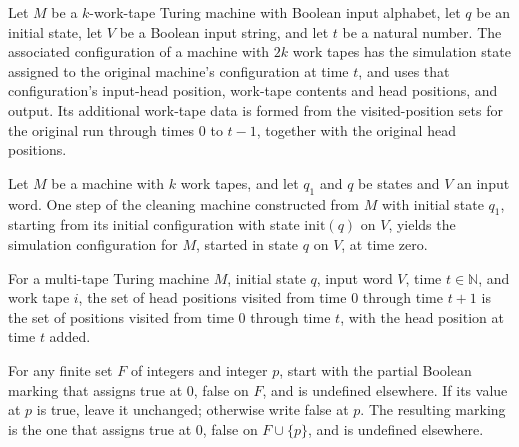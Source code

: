 \begin{definition}
\label{Complexity.LogProg.simCfg}
\leanok
{}
Let $M$ be a $k$-work-tape Turing machine with Boolean input alphabet, let $q$ be an
initial state, let $V$ be a Boolean input string, and let $t$ be a natural number. The
associated configuration of a machine with $2k$ work tapes has the simulation state
assigned to the original machine's configuration at time $t$, and uses that
configuration's input-head position, work-tape contents and head positions, and output.
Its additional work-tape data is formed from the visited-position sets for the original
run through times $0$ to $t-1$, together with the original head positions.
\end{definition}

\begin{lemma}
\label{Complexity.LogProg.init_step}
\leanok
{}
Let $M$ be a machine with $k$ work tapes, and let $q_1$ and $q$ be states and $V$ an
input word. One step of the cleaning machine constructed from $M$ with initial state
$q_1$, starting from its initial configuration with state $\mathrm{init}(q)$ on $V$,
yields the simulation configuration for $M$, started in state $q$ on $V$, at time zero.
\end{lemma}

\begin{lemma}
\label{Complexity.LogProg.visB_succ}
\leanok
{}
For a multi-tape Turing machine $M$, initial state $q$, input word $V$, time
$t\in\mathbb N$, and work tape $i$, the set of head positions visited from time $0$
through time $t+1$ is the set of positions visited from time $0$ through time $t$, with
the head position at time $t$ added.
\end{lemma}

\begin{lemma}
\label{Complexity.LogProg.wr_markSet}
\leanok
{}
For any finite set $F$ of integers and integer $p$, start with the partial Boolean
marking that assigns true at $0$, false on $F$, and is undefined elsewhere. If its value
at $p$ is true, leave it unchanged; otherwise write false at $p$. The resulting marking
is the one that assigns true at $0$, false on $F\cup\{p\}$, and is undefined elsewhere.
\end{lemma}

